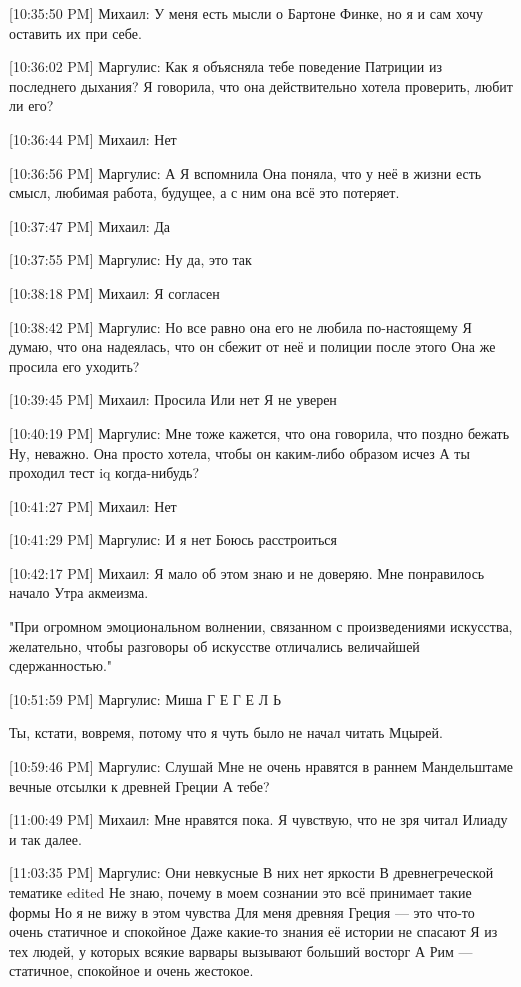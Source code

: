 \documentclass{article}
\begin{document}
{[10:35:50 PM] Михаил:
У меня есть мысли о Бартоне Финке, но я и сам хочу оставить их при себе.

[10:36:02 PM] Маргулис:
Как я объясняла тебе поведение Патриции из последнего дыхания?
 Я говорила, что она действительно хотела проверить, любит ли его?

[10:36:44 PM] Михаил:
Нет

[10:36:56 PM] Маргулис:
А
 Я вспомнила
 Она поняла, что у неё в жизни есть смысл, любимая работа, будущее, а с ним она всё это потеряет.

[10:37:47 PM] Михаил:
Да

[10:37:55 PM] Маргулис:
Ну да, это так

[10:38:18 PM] Михаил:
Я согласен

[10:38:42 PM] Маргулис:
Но все равно она его не любила по-настоящему
 Я думаю, что она надеялась, что он сбежит от неё и полиции после этого
 Она же просила его уходить?

[10:39:45 PM] Михаил:
Просила
 Или нет
 Я не уверен

[10:40:19 PM] Маргулис:
Мне тоже кажется, что она говорила, что поздно бежать
 Ну, неважно. Она просто хотела, чтобы он каким-либо образом исчез
 А ты проходил тест iq когда-нибудь?

[10:41:27 PM] Михаил:
Нет

[10:41:29 PM] Маргулис:
И я нет
 Боюсь расстроиться

[10:42:17 PM] Михаил:
Я мало об этом знаю и не доверяю.
 Мне понравилось начало Утра акмеизма.

"При огромном эмоциональном волнении, связанном с произведениями искусства, желательно, чтобы разговоры об искусстве отличались величайшей сдержанностью."

[10:51:59 PM] Маргулис:
Миша
 Г
 Е
 Г
 Е
 Л
 Ь
 
 
 Ты, кстати, вовремя, потому что я чуть было не начал читать Мцырей.

[10:59:46 PM] Маргулис:
Слушай
 Мне не очень нравятся в раннем Мандельштаме вечные отсылки к древней Греции
 А тебе?

[11:00:49 PM] Михаил:
Мне нравятся пока.
 Я чувствую, что не зря читал Илиаду и так далее.

[11:03:35 PM] Маргулис:
Они невкусные
 В них нет яркости
 В древнегреческой тематике
edited 
Не знаю, почему в моем сознании это всё принимает такие формы
 Но я не вижу в этом чувства
 Для меня древняя Греция — это что-то очень статичное и спокойное
 Даже какие-то знания её истории не спасают
 Я из тех людей, у которых всякие варвары вызывают больший восторг
 А Рим — статичное, спокойное и очень жестокое.

}
\end{document}

